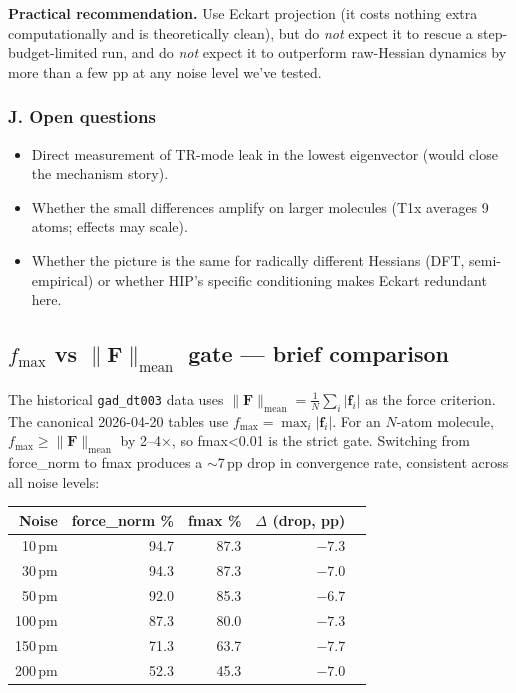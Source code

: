 \documentclass[11pt]{article}
\begin{document}
\textbf{Practical recommendation.} Use Eckart projection (it costs
nothing extra computationally and is theoretically clean), but do
\emph{not} expect it to rescue a step-budget-limited run, and do
\emph{not} expect it to outperform raw-Hessian dynamics by more than
a few pp at any noise level we've tested.

\subsubsection*{J. Open questions}

\begin{itemize}[nosep,leftmargin=1.5em]
\item Direct measurement of TR-mode leak in the lowest eigenvector
      (would close the mechanism story).
\item Whether the small differences amplify on larger molecules (T1x
      averages 9 atoms; effects may scale).
\item Whether the picture is the same for radically different
      Hessians (DFT, semi-empirical) or whether HIP's specific
      conditioning makes Eckart redundant here.
\end{itemize}

\clearpage
\subsection{$f_{\max}$ vs $\|\mathbf{F}\|_{\text{mean}}$ gate --- brief comparison}
\label{sec:fmax_vs_fnorm}

The historical \texttt{gad\_dt003} data uses
$\|\mathbf{F}\|_{\text{mean}} = \frac{1}{N}\sum_i |\mathbf{f}_i|$ as the
force criterion. The canonical 2026-04-20 tables use $f_{\max} = \max_i |\mathbf{f}_i|$.
For an $N$-atom molecule, $f_{\max} \geq \|\mathbf{F}\|_{\text{mean}}$ by 2--4$\times$,
so fmax<0.01 is the strict gate. Switching from force\_norm to fmax produces a
$\sim$7\,pp drop in convergence rate, consistent across all noise levels:

\begin{center}
\begin{tabular}{rrrrr}
\toprule
Noise & force\_norm \% & fmax \% & $\Delta$ (drop, pp) \\
\midrule
10\,pm  & 94.7 & 87.3 & $-7.3$ \\
30\,pm  & 94.3 & 87.3 & $-7.0$ \\
50\,pm  & 92.0 & 85.3 & $-6.7$ \\
100\,pm & 87.3 & 80.0 & $-7.3$ \\
150\,pm & 71.3 & 63.7 & $-7.7$ \\
200\,pm & 52.3 & 45.3 & $-7.0$ \\
\bottomrule
\end{tabular}
\end{center}
\end{document}
